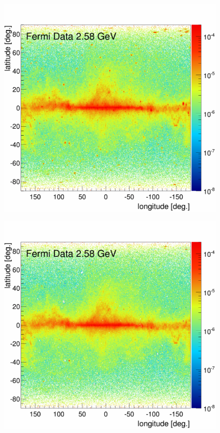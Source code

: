 \begin{figure}[h]
  \centering
  \begin{minipage}[h]{0.45\textwidth}
  	\centering
	\includegraphics[width=1.\linewidth]{pic/method/Flux_FermiData_raw_E12.png}
  	\subcaption{}
  	\label{fig:raw_data}
  \end{minipage}
  \hfill
  \begin{minipage}[h]{0.45\textwidth}
	  \centering
	  \includegraphics[width=1.\linewidth]{pic/method/Flux_FermiData-3FGL_E12.png}

\end{minipage}
\end{figure}
